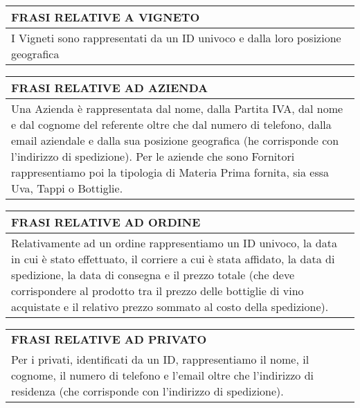 \begin{center}
	\vspace{0.5cm}
	
	\begin{tabular}{P{16cm}}
		\toprule
		 \textbf {\large {FRASI RELATIVE A VIGNETO}} \\
		\midrule
		I Vigneti sono rappresentati da un ID univoco e dalla loro posizione geografica\\
		\bottomrule
	\end{tabular}
	
	\vspace{0.5cm}
	
	\begin{tabular}{P{16cm}}
		\toprule
		 \textbf {\large {FRASI RELATIVE AD AZIENDA}} \\
		\midrule

		Una Azienda è rappresentata dal nome, dalla Partita IVA, dal nome e dal cognome del referente oltre che dal numero di telefono, dalla email aziendale e dalla sua posizione geografica (he corrisponde con l'indirizzo di spedizione). Per le aziende che sono Fornitori rappresentiamo poi la tipologia di Materia Prima fornita, sia essa Uva, Tappi o Bottiglie.\\
		\bottomrule
	\end{tabular}
	
	\vspace{0.5cm}
	
	\begin{tabular}{P{16cm}}
		\toprule
		 \textbf {\large {FRASI RELATIVE AD ORDINE}} \\
		\midrule
		Relativamente ad un ordine rappresentiamo un ID univoco, la data in cui è stato effettuato, il corriere a cui è stata affidato, la data di spedizione, la data di consegna e il prezzo totale (che deve corrispondere al prodotto tra il prezzo delle bottiglie di vino acquistate e il relativo prezzo sommato al costo della spedizione).\\
		\bottomrule
	\end{tabular}
	
	\vspace{0.5cm}
	
	\begin{tabular}{P{16cm}}
		\toprule
		 \textbf {\large {FRASI RELATIVE AD PRIVATO}} \\
		Per i privati, identificati da un ID, rappresentiamo il nome, il cognome, il numero di telefono e l'email oltre che l'indirizzo di residenza (che corrisponde con l'indirizzo di spedizione).\\
		\bottomrule
	\end{tabular}
	

\end{center}
